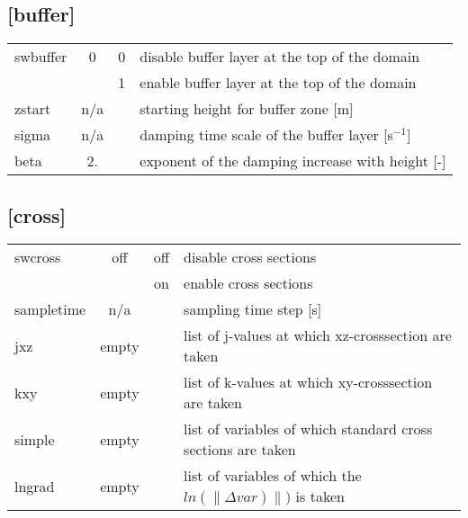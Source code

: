 \documentclass[a4paper,10pt]{extarticle}
\begin{document}
\subsection*{[buffer]}
\tablelasttail{\hline}
\begin{supertabular}{lccl}
swbuffer & 0   & 0 & disable buffer layer at the top of the domain \\
         &     & 1 & enable buffer layer at the top of the domain \\
zstart   & n/a &   & starting height for buffer zone [m]\\
sigma    & n/a &   & damping time scale of the buffer layer [s$^{-1}$]\\
beta     & 2.  &   & exponent of the damping increase with height [-] \\
\end{supertabular}
\subsection*{[cross]}
\tablelasttail{\hline}
\begin{supertabular}{lccl}
swcross       & off   & off & disable cross sections \\
              &       & on  & enable cross sections \\ 
sampletime    & n/a   &     & sampling time step [s] \\
jxz           & empty &     & list of j-values at which xz-crosssection are taken \\
kxy           & empty &     & list of k-values at which xy-crosssection are taken \\
simple        & empty &     & list of variables of which standard cross sections are taken \\
lngrad        & empty &     & list of variables of which the $ln( \|\Delta var)\| )$ is taken \\
\end{supertabular}
\end{document}
